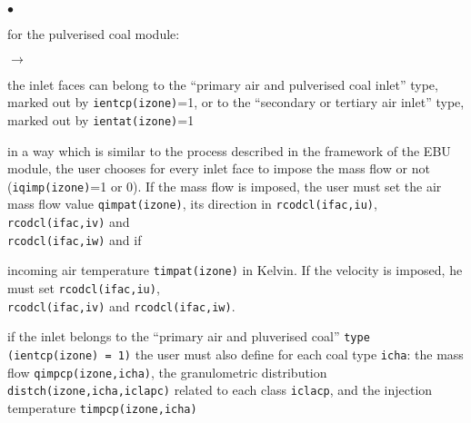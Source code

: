 {{{\begin{list}{$\bullet$}{}
       \item for the pulverised coal module:
             \begin{list}{$\rightarrow$}{}
                    \item the inlet faces can belong to the ``primary
                          air and pulverised coal inlet'' type, marked
                          out by \texttt{ientcp(izone)}=1, or to
                          the ``secondary or tertiary air inlet'' type,
                          marked out by \texttt{ientat(izone)}=1
                    \item in a way which is similar to the process
                          described in the framework of the EBU module,
                          the user chooses for every inlet face to
                          impose the mass flow or not (\texttt{iqimp(izone)}=1 or
                          0). If the mass flow is imposed, the user
                          must set the air mass flow value
                          \texttt{qimpat(izone)}, its direction in
                          \texttt{rcodcl(ifac,iu)}, \texttt{rcodcl(ifac,iv)}
                          and \\ \texttt{rcodcl(ifac,iw)} and if
                    \item incoming air temperature \texttt{timpat(izone)} in
                          Kelvin. If the velocity is imposed, he must
                          set  \texttt{rcodcl(ifac,iu)}, \\
                          \texttt{rcodcl(ifac,iv)} and \texttt{rcodcl(ifac,iw)}.

                    \item if the inlet belongs to the ``primary air and
                          pluverised coal'' \texttt{type (ientcp(izone) = 1)} the
                          user must also define for each coal type \texttt{icha}:
                          the mass flow
                          \texttt{qimpcp(izone,icha)}, the
                          granulometric distribution
                          \texttt{distch(izone,icha,iclapc)}
                          related to each class \texttt{iclacp}, and the
                          injection temperature
                          \texttt{timpcp(izone,icha)}

             \end{list}
\end{list}

}}}
